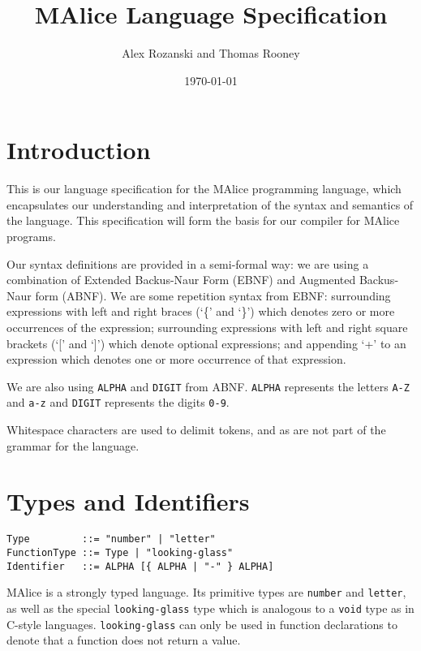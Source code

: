 \documentclass[a4wide, 11pt]{article}
\begin{document}
\title{MAlice Language Specification}

\author{Alex Rozanski and Thomas Rooney}

\date{\today}         %

\maketitle            %

\section{Introduction}

This is our language specification for the MAlice programming language, which encapsulates our understanding and interpretation of the syntax and semantics of the language. This specification will form the basis for our compiler for MAlice programs.

Our syntax definitions are provided in a semi-formal way: we are using a combination of Extended Backus-Naur Form (EBNF) and Augmented Backus-Naur form (ABNF). We are some repetition syntax from EBNF: surrounding expressions with left and right braces (`\{' and `\}') which denotes zero or more occurrences of the expression; surrounding expressions with left and right square brackets (`[' and `]') which denote optional expressions; and appending `+' to an expression which denotes one or more occurrence of that expression.

We are also using \texttt{ALPHA} and \texttt{DIGIT} from ABNF. \texttt{ALPHA} represents the letters \texttt{A-Z} and \texttt{a-z} and \texttt{DIGIT} represents the digits \texttt{0-9}.

Whitespace characters are used to delimit tokens, and as are not part of the grammar for the language.

\section{Types and Identifiers}

\begin{verbatim}
Type         ::= "number" | "letter"
FunctionType ::= Type | "looking-glass"
Identifier   ::= ALPHA [{ ALPHA | "-" } ALPHA]
\end{verbatim}

MAlice is a strongly typed language. Its primitive types are \texttt{number} and \texttt{letter}, as well as the special \texttt{looking-glass} type which is analogous to a \texttt{void} type as in C-style languages. \texttt{looking-glass} can only be used in function declarations to denote that a function does not return a value.
\end{document}
